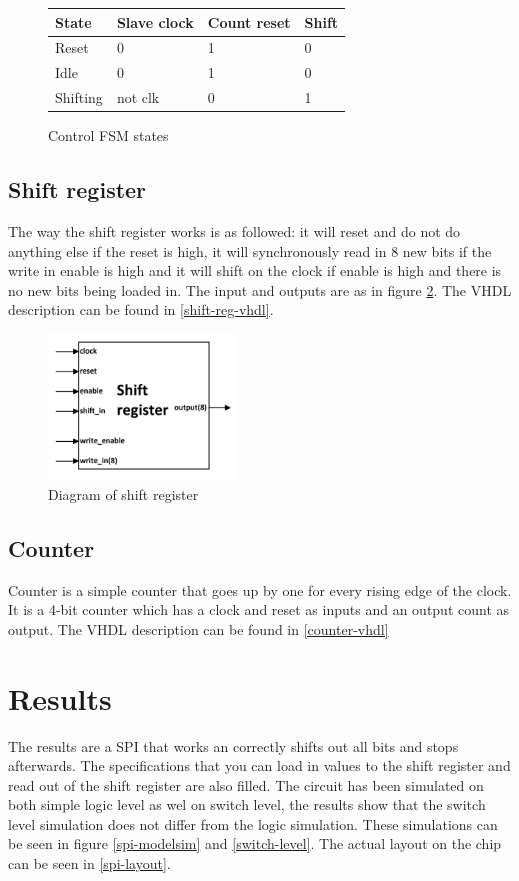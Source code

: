 \documentclass[11pt,twoside,a4paper]{article}
\begin{document}
\begin{figure}
\begin{center}
    \begin{tabular}{ | l | l | l | l |}
    \hline
    State & Slave clock & Count reset & Shift \\ \hline
    Reset & 0 & 1 & 0 \\ \hline
    Idle & 0 & 1 & 0 \\ \hline
    Shifting & not clk  & 0 & 1 \\
    \hline
    \end{tabular}
\end{center}
\caption{Control FSM states}
\label{control-states}
\end{figure}

\subsection{Shift register}
The way the shift register works is as followed: it will reset and do not do anything else if the reset is high, it will synchronously read in 8 new bits if the write in enable is high and it will shift on the clock if enable is high and there is no new bits being loaded in. The input and outputs are as in figure \ref{shift-register}. The VHDL description can be found in \ref{shift-reg-vhdl}.

\begin{figure}[htp!]
\center
\includegraphics[width=5cm]{./shift_register_diagram}
\caption{Diagram of shift register}
\label{shift-register}
\end{figure}

\subsection{Counter}
Counter is a simple counter that goes up by one for every rising edge of the clock. It is a 4-bit counter which has a clock and reset as inputs and an output count as output. The VHDL description can be found in \ref{counter-vhdl}

\section{Results}
The results are a SPI that works an correctly shifts out all bits and stops afterwards. The specifications that you can load in values to the shift register and read out of the shift register are also filled. The circuit has been simulated on both simple logic level as wel on switch level, the results show that the switch level simulation does not differ from the logic simulation. These simulations can be seen in figure \ref{spi-modelsim} and \ref{switch-level}. The actual layout on the chip can be seen in \ref{spi-layout}.
\end{document}
